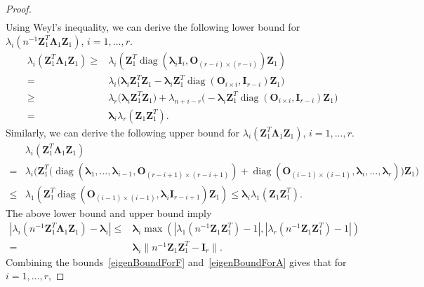 \documentclass[12pt]{article} %
\DeclareMathOperator{\mydiag}{diag}
\newcommand{\bZ}{\mathbf{Z}}
\newcommand{\bO}{\mathbf{O}}
\newcommand{\bI}{\mathbf{I}}
\newcommand{\bfsym}[1]{\ensuremath{\boldsymbol{#1}}}
\def\blambda {\bfsym {\lambda}}
\def\bLambda {\bfsym {\Lambda}}
\theoremstyle{definition}
\begin{document}
\begin{appendices}
\begin{proof}
\begin{equation}
\begin{split}
        \end{split}
    \end{equation}
    Using Weyl's inequality, we can derive the following lower bound for $\lambda_i(n^{-1}\bZ_1^T \bLambda_1 \bZ_1)$, $ i=1,\ldots, r$.
\begin{equation*}\label{eq:DLower}
\begin{aligned}
\lambda_i(\bZ_1^T \bLambda_1 \bZ_1)
\geq&
\lambda_i(\bZ_1^T \mydiag(\blambda_i \bI_{i},\bO_{(r-i)\times(r-i)}) \bZ_1)
\\
    =&
    \lambda_i\Big( \blambda_i \bZ_1^T \bZ_1-\blambda_i\bZ_1^T \mydiag(\bO_{i\times i}, \bI_{r-i}) \bZ_1\Big)\\
    \geq&
    \lambda_r\Big( \blambda_i \bZ_1^T \bZ_1\Big)+\lambda_{n+i-r}\Big(-\blambda_i\bZ_1^T \mydiag(\bO_{i\times i}, \bI_{r-i}) \bZ_1\Big)\\
= &
\blambda_i \lambda_r(\bZ_1\bZ_1^T).
\end{aligned}
\end{equation*}
Similarly, we can derive the following upper bound for
$\lambda_i(\bZ_1^T \bLambda_1 \bZ_1)$, $i=1,\ldots,r$.
\begin{equation*}\label{eq:DUpper}
\begin{aligned}
&\lambda_i(\bZ_1^T \bLambda_1 \bZ_1)
\\
=&\lambda_i\Big(
\bZ_1^T \big(
\mydiag(\blambda_1,\ldots,\blambda_{i-1},\bO_{(r-i+1)\times(r-i+1)})+
\mydiag(\bO_{(i-1)\times(i-1)},\blambda_i,\ldots,\blambda_r)
\big)
\bZ_1
\Big)\\
    \leq&
\lambda_1(\bZ_1^T \mydiag(\bO_{(i-1)\times(i-1)},\blambda_i \bI_{r-i+1}) \bZ_1)
\leq  \blambda_i \lambda_1(\bZ_1\bZ_1^T).
\end{aligned}
\end{equation*}
The above lower bound and upper bound imply
\begin{equation}\label{eigenBoundForA}
    \begin{aligned}
\left|
\lambda_i(n^{-1}\bZ_1^T \bLambda_1 \bZ_1)-\blambda_i
\right|
\leq&
\blambda_i 
\max\left(
    |\lambda_1(n^{-1}\bZ_1 \bZ_1^T)-1|,
    |\lambda_r(n^{-1}\bZ_1 \bZ_1^T)-1|
\right)
\\
=&\blambda_i \|n^{-1}\bZ_1\bZ_1^T -\bI_r\|.
    \end{aligned}
\end{equation}
Combining the bounds~\eqref{eigenBoundForF} and~\eqref{eigenBoundForA} gives that for $i=1,\ldots,r$,

\end{proof}
\end{appendices}
\end{document}

